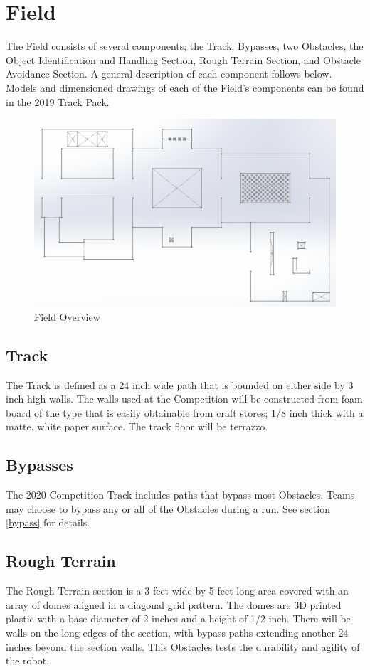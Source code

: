 \section{Field}
The Field consists of several components; the Track, Bypasses, two Obstacles, the Object Identification and Handling Section, Rough Terrain Section, and Obstacle Avoidance Section. A general description of each component follows below. Models and dimensioned drawings of each of the Field’s components can be found in the {\href{https://mercury.okstate.edu/content/mercury-challenge}{2019 Track Pack}}.

\begin{figure}[H]
	\centering
	\includegraphics[width=.85\textwidth]{images/track_overview_wlabels.png}
	\caption{Field Overview}
	\label{fig:field} 
\end{figure}

\subsection{Track}
The Track is defined as a 24 inch wide path that is bounded on either side by 3 inch high walls. The walls used at the Competition will be constructed from foam board of the type that is easily obtainable from craft stores; 1/8 inch thick with a matte, white paper surface. The track floor will be terrazzo.

\subsection{Bypasses}
The 2020 Competition Track includes paths that bypass most Obstacles. Teams may choose to bypass any or all of the Obstacles during a run. See section \ref{bypass} for details.

\subsection{Rough Terrain}
The Rough Terrain section is a 3 feet wide by 5 feet long area covered with an array of domes aligned in a diagonal grid pattern. The domes are 3D printed plastic with a base diameter of 2 inches and a height of 1/2 inch. There will be walls on the long edges of the section, with bypass paths extending another 24 inches beyond the section walls. This Obstacles tests the durability and agility of the robot.

